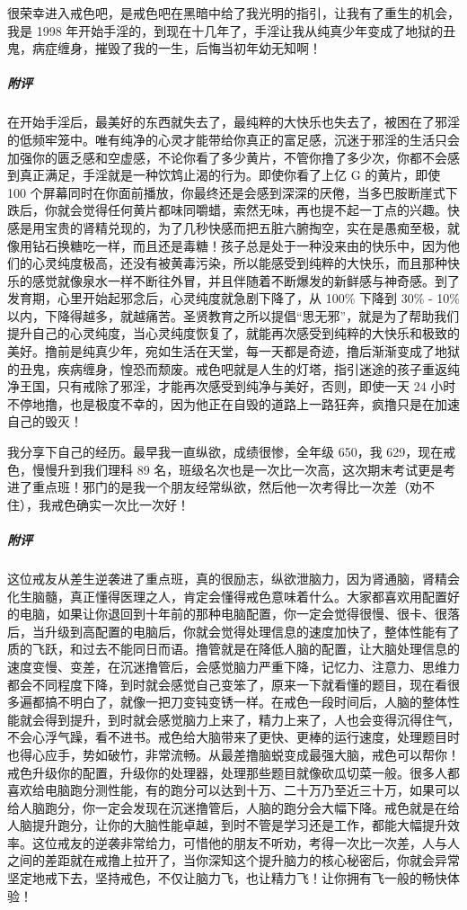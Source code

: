 \begin{case}
    很荣幸进入戒色吧，是戒色吧在黑暗中给了我光明的指引，让我有了重生的机会，我是 1998 年开始手淫的，到现在十几年了，手淫让我从纯真少年变成了地狱的丑鬼，病症缠身，摧毁了我的一生，后悔当初年幼无知啊！
    \subparagraph{附评} 在开始手淫后，最美好的东西就失去了，最纯粹的大快乐也失去了，被困在了邪淫的低频牢笼中。唯有纯净的心灵才能带给你真正的富足感，沉迷于邪淫的生活只会加强你的匮乏感和空虚感，不论你看了多少黄片，不管你撸了多少次，你都不会感到真正满足，手淫就是一种饮鸩止渴的行为。即使你看了上亿 G 的黄片，即使 100 个屏幕同时在你面前播放，你最终还是会感到深深的厌倦，当多巴胺断崖式下跌后，你就会觉得任何黄片都味同嚼蜡，索然无味，再也提不起一丁点的兴趣。快感是用宝贵的肾精兑现的，为了几秒快感而把五脏六腑掏空，实在是愚痴至极，就像用钻石换糖吃一样，而且还是毒糖！孩子总是处于一种没来由的快乐中，因为他们的心灵纯度极高，还没有被黄毒污染，所以能感受到纯粹的大快乐，而且那种快乐的感觉就像泉水一样不断往外冒，并且伴随着不断爆发的新鲜感与神奇感。到了发育期，心里开始起邪念后，心灵纯度就急剧下降了，从 100\% 下降到 30\% - 10\% 以内，下降得越多，就越痛苦。圣贤教育之所以提倡“思无邪”，就是为了帮助我们提升自己的心灵纯度，当心灵纯度恢复了，就能再次感受到纯粹的大快乐和极致的美好。撸前是纯真少年，宛如生活在天堂，每一天都是奇迹，撸后渐渐变成了地狱的丑鬼，疾病缠身，惶恐而颓废。戒色吧就是人生的灯塔，指引迷途的孩子重返纯净王国，只有戒除了邪淫，才能再次感受到纯净与美好，否则，即使一天 24 小时不停地撸，也是极度不幸的，因为他正在自毁的道路上一路狂奔，疯撸只是在加速自己的毁灭！
\end{case}

\begin{case}
    我分享下自己的经历。最早我一直纵欲，成绩很惨，全年级 650，我 629，现在戒色，慢慢升到我们理科 89 名，班级名次也是一次比一次高，这次期末考试更是考进了重点班！邪门的是我一个朋友经常纵欲，然后他一次考得比一次差（劝不住），我戒色确实一次比一次好！
    \subparagraph{附评} 这位戒友从差生逆袭进了重点班，真的很励志，纵欲泄脑力，因为肾通脑，肾精会化生脑髓，真正懂得医理之人，肯定会懂得戒色意味着什么。大家都喜欢用配置好的电脑，如果让你退回到十年前的那种电脑配置，你一定会觉得很慢、很卡、很落后，当升级到高配置的电脑后，你就会觉得处理信息的速度加快了，整体性能有了质的飞跃，和过去不能同日而语。撸管就是在降低人脑的配置，让大脑处理信息的速度变慢、变差，在沉迷撸管后，会感觉脑力严重下降，记忆力、注意力、思维力都会不同程度下降，到时就会感觉自己变笨了，原来一下就看懂的题目，现在看很多遍都搞不明白了，就像一把刀变钝变锈一样。在戒色一段时间后，人脑的整体性能就会得到提升，到时就会感觉脑力上来了，精力上来了，人也会变得沉得住气，不会心浮气躁，看不进书。戒色给大脑带来了更快、更棒的运行速度，处理题目时也得心应手，势如破竹，非常流畅。从最差撸脑蜕变成最强大脑，戒色可以帮你！戒色升级你的配置，升级你的处理器，处理那些题目就像砍瓜切菜一般。很多人都喜欢给电脑跑分测性能，有的跑分可以达到十万、二十万乃至近三十万，如果可以给人脑跑分，你一定会发现在沉迷撸管后，人脑的跑分会大幅下降。戒色就是在给人脑提升跑分，让你的大脑性能卓越，到时不管是学习还是工作，都能大幅提升效率。这位戒友的逆袭非常给力，可惜他的朋友不听劝，考得一次比一次差，人与人之间的差距就在戒撸上拉开了，当你深知这个提升脑力的核心秘密后，你就会异常坚定地戒下去，坚持戒色，不仅让脑力飞，也让精力飞！让你拥有飞一般的畅快体验！
\end{case}

